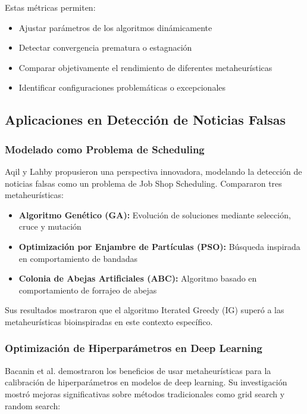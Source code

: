 Estas métricas permiten:
\begin{itemize}
    \item Ajustar parámetros de los algoritmos dinámicamente
    \item Detectar convergencia prematura o estagnación
    \item Comparar objetivamente el rendimiento de diferentes metaheurísticas
    \item Identificar configuraciones problemáticas o excepcionales
\end{itemize}

\subsection{Aplicaciones en Detección de Noticias Falsas}

\subsubsection{Modelado como Problema de Scheduling}

Aqil y Lahby \cite{aqil2021modeling} propusieron una perspectiva innovadora, modelando la detección de noticias falsas como un problema de Job Shop Scheduling. Compararon tres metaheurísticas:
\begin{itemize}
    \item \textbf{Algoritmo Genético (GA):} Evolución de soluciones mediante selección, cruce y mutación
    \item \textbf{Optimización por Enjambre de Partículas (PSO):} Búsqueda inspirada en comportamiento de bandadas
    \item \textbf{Colonia de Abejas Artificiales (ABC):} Algoritmo basado en comportamiento de forrajeo de abejas
\end{itemize}

Sus resultados mostraron que el algoritmo Iterated Greedy (IG) superó a las metaheurísticas bioinspiradas en este contexto específico.

\subsubsection{Optimización de Hiperparámetros en Deep Learning}

Bacanin et al. \cite{bacanin2023benefits} demostraron los beneficios de usar metaheurísticas para la calibración de hiperparámetros en modelos de deep learning. Su investigación mostró mejoras significativas sobre métodos tradicionales como grid search y random search:

